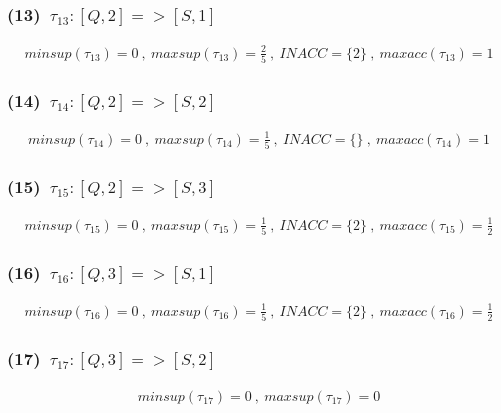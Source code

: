 \documentclass[a4paper,12pt]{jarticle}
\begin{document}
\subsubsection*{(13)~$\tau_{13}:[Q,2]=>[S,1]$}
\vspace{-4mm}
%
\begin{align*}
 minsup(\tau_{13})=0~,~maxsup(\tau_{13})=\frac{2}{5}~,~INACC=\{2\}~,~maxacc(\tau_{13})=1
\end{align*}
%
\vspace{-10mm}
\subsubsection*{(14)~$\tau_{14}:[Q,2]=>[S,2]$}
\vspace{-4mm}
%
\begin{align*}
 minsup(\tau_{14})=0~,~maxsup(\tau_{14})=\frac{1}{5}~,~INACC=\{\}~,~maxacc(\tau_{14})=1
\end{align*}
%
\vspace{-10mm}
\subsubsection*{(15)~$\tau_{15}:[Q,2]=>[S,3]$}
\vspace{-4mm}
%
\begin{align*}
 minsup(\tau_{15})=0~,~maxsup(\tau_{15})=\frac{1}{5}~,~INACC=\{2\}~,~maxacc(\tau_{15})=\frac{1}{2}
\end{align*}
%
\vspace{-10mm}
\subsubsection*{(16)~$\tau_{16}:[Q,3]=>[S,1]$}
\vspace{-4mm}
%
\begin{align*}
 minsup(\tau_{16})=0~,~maxsup(\tau_{16})=\frac{1}{5}~,~INACC=\{2\}~,~maxacc(\tau_{16})=\frac{1}{2}
\end{align*}
%
\vspace{-10mm}
\subsubsection*{(17)~$\tau_{17}:[Q,3]=>[S,2]$}
\vspace{-4mm}
%
\begin{align*}
 minsup(\tau_{17})=0~,~maxsup(\tau_{17})=0
\end{align*}
%
\vspace{-10mm}
\end{document}
